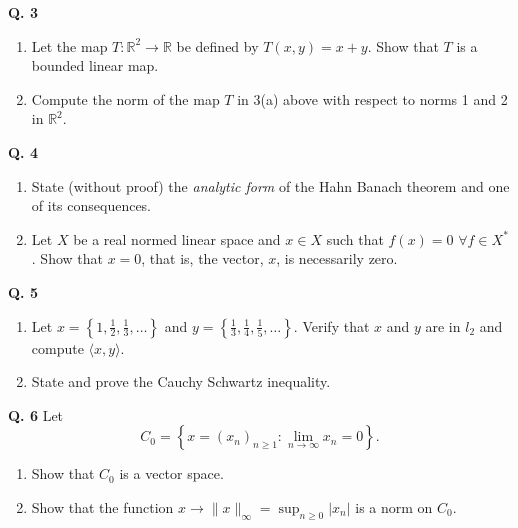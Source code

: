 \documentclass[11pt,a4paper]{article}
\begin{document}
\vspace{0.3cm}

\noindent \textbf{Q. 3} 
\begin{enumerate}[label=(\alph*)]
    \item Let the map $T : \mathbb{R}^2 \to \mathbb{R}$ be defined by $T(x, y) = x+y$. Show that $T$ is a bounded linear map.%
    
    \item Compute the norm of the map $T$ in 3(a) above with respect to norms 1 and 2 in $\mathbb{R}^2$. %
\end{enumerate}

\vspace{0.3cm}

\noindent \textbf{Q. 4} 
\begin{enumerate}[label=(\alph*)]
    \item State (without proof) the \emph{analytic form} of the Hahn Banach theorem and one of its consequences.%
    
    \item Let $X$ be a real normed linear space and $x \in X$ such that $f(x) = 0$ $\forall f \in X^*$. Show that $x = 0$, that is, the vector, $x$, is necessarily zero. %
\end{enumerate}

\vspace{0.3cm}

\noindent \textbf{Q. 5} 
\begin{enumerate}[label=(\alph*)]
    \item Let $x = \left\{1, \frac{1}{2}, \frac{1}{3}, \ldots \right\}$ and $y = \left\{\frac{1}{3}, \frac{1}{4}, \frac{1}{5}, \ldots \right\}$. Verify that $x$ and $y$ are in $l_2$ and compute $\langle x, y\rangle$. %
    
    \item State and prove the Cauchy Schwartz inequality. %
\end{enumerate}

\vspace{0.3cm}

\noindent \textbf{Q. 6} Let
\[
C_0 = \left\{x = (x_n)_{n\geq1} : \lim_{n\to\infty}x_n = 0\right\}.
\]

\begin{enumerate}[label=(\alph*)]
    \item Show that $C_0$ is a vector space. %
    
    \item Show that the function $x \to \|x\|_\infty = \sup_{n\geq0}|x_n|$ is a norm on $C_0$. %
\end{enumerate}
\end{document}
